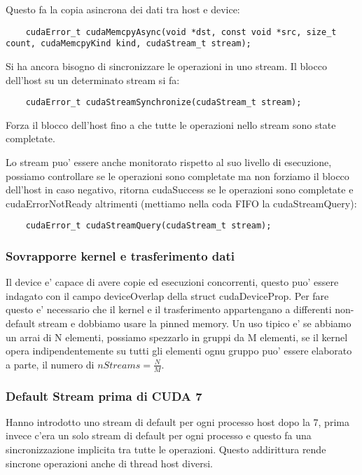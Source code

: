 Questo fa la copia asincrona dei dati tra host e device:
\begin{lstlisting}
    cudaError_t cudaMemcpyAsync(void *dst, const void *src, size_t count, cudaMemcpyKind kind, cudaStream_t stream);
\end{lstlisting}

Si ha ancora bisogno di sincronizzare le operazioni in uno stream. Il blocco dell'host su un determinato stream si fa:
\begin{lstlisting}
    cudaError_t cudaStreamSynchronize(cudaStream_t stream);
\end{lstlisting}
Forza il blocco dell'host fino a che tutte le operazioni nello stream sono state completate.

Lo stream puo' essere anche monitorato rispetto al suo livello di esecuzione, possiamo controllare se le operazioni sono completate ma non forziamo il blocco dell'host in caso negativo, ritorna cudaSuccess se le operazioni sono completate e cudaErrorNotReady altrimenti (mettiamo nella coda FIFO la cudaStreamQuery):
\begin{lstlisting}
    cudaError_t cudaStreamQuery(cudaStream_t stream);
\end{lstlisting}

\subsubsection{Sovrapporre kernel e trasferimento dati}
Il device e' capace di avere copie ed esecuzioni concorrenti, questo puo' essere indagato con il campo deviceOverlap della struct cudaDeviceProp.
Per fare questo e' necessario che il kernel e il trasferimento appartengano a differenti non-default stream e dobbiamo usare la pinned memory.
Un uso tipico e' se abbiamo un arrai di N elementi, possiamo spezzarlo in gruppi da M elementi, se il kernel opera indipendentemente su tutti gli elementi ognu gruppo puo' essere elaborato a parte, il numero di $nStreams = \frac{N}{M}$.

\subsubsection{Default Stream prima di CUDA 7}
Hanno introdotto uno stream di default per ogni processo host dopo la 7, prima invece c'era un solo stream di default per ogni processo e questo fa una sincronizzazione implicita tra tutte le operazioni. Questo addirittura rende sincrone operazioni anche di thread host diversi.

